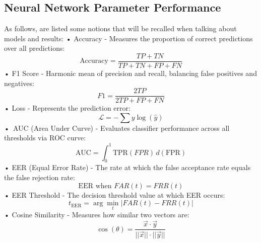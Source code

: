 \subsection{Neural Network Parameter Performance}
As follows, are listed some notions that will be recalled when talking about models and results:\newline
• Accuracy - Measures the proportion of correct predictions over all predictions:\newline 
\[
\text{Accuracy} = \frac{TP + TN}{TP + TN + FP + FN}
\]
• F1 Score - Harmonic mean of precision and recall, balancing false positives and negatives:\newline 
\[
F1 = \frac{2TP}{2TP + FP + FN}
\]
• Loss - Represents the prediction error:\newline
\[
\mathcal{L} = -\sum y \log(\hat{y})
\]
• AUC (Area Under Curve) - Evaluates classifier performance across all thresholds via ROC curve: \newline 
\[
\text{AUC} = \int_{0}^{1} \text{TPR}(FPR) \, d(\text{FPR})
\]
• EER (Equal Error Rate) - The rate at which the false acceptance rate equals the false rejection rate:\newline
\[
\text{EER} \text{ when } FAR(t) = FRR(t)
\]
• EER Threshold - The decision threshold value at which EER occurs:\newline
\[
t_{\text{EER}} = \arg\min_t |FAR(t) - FRR(t)|
\]
• Cosine Similarity - Measures how similar two vectors are:\newline
\[
\cos(\theta) = \frac{\vec{x} \cdot \vec{y}}{||\vec{x}|| \cdot ||\vec{y}||}
\]

